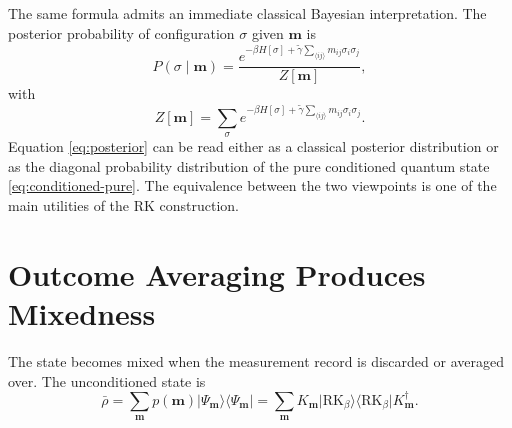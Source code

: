 \documentclass[11pt]{article}
\newcommand{\ket}[1]{\lvert #1\rangle}
\newcommand{\bra}[1]{\langle #1\rvert}
\begin{document}
The same formula admits an immediate classical Bayesian interpretation. The posterior probability of configuration $\sigma$ given $\bm m$ is
\begin{equation}
P(\sigma\mid \bm m)
=
\frac{
e^{-\beta H[\sigma]+\tilde\gamma\sum_{\langle ij\rangle}m_{ij}\sigma_i\sigma_j}
}{
Z[\bm m]
},
\label{eq:posterior}
\end{equation}
with
\begin{equation}
Z[\bm m]
=
\sum_{\sigma}
e^{-\beta H[\sigma]+\tilde\gamma\sum_{\langle ij\rangle}m_{ij}\sigma_i\sigma_j}.
\label{eq:z-of-m}
\end{equation}
Equation \eqref{eq:posterior} can be read either as a classical posterior distribution or as the diagonal probability distribution of the pure conditioned quantum state \eqref{eq:conditioned-pure}. The equivalence between the two viewpoints is one of the main utilities of the RK construction.

\section{Outcome Averaging Produces Mixedness}

The state becomes mixed when the measurement record is discarded or averaged over. The unconditioned state is
\begin{equation}
\bar\rho
=
\sum_{\bm m} p(\bm m)\ket{\Psi_{\bm m}}\bra{\Psi_{\bm m}}
=
\sum_{\bm m} K_{\bm m}\ket{\mathrm{RK}_\beta}\bra{\mathrm{RK}_\beta}K_{\bm m}^\dagger.
\label{eq:unconditioned-state}
\end{equation}
\end{document}
